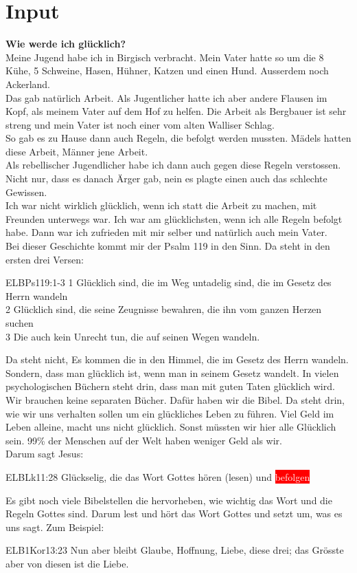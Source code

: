 \documentclass[12pt,a4paper]{scrarticle}
\begin{document}
\section{ Input }
\begin{spacing}{1.5}
\textbf{Wie werde ich glücklich?}\\
Meine Jugend habe ich in Birgisch verbracht. Mein Vater hatte so um die 8 Kühe, 5 Schweine, Hasen, Hühner, Katzen und einen Hund. Ausserdem noch Ackerland.\\
Das gab natürlich Arbeit. Als Jugentlicher hatte ich aber andere Flausen im Kopf, als meinem Vater auf dem Hof zu helfen. Die Arbeit als Bergbauer ist sehr streng und mein Vater ist noch einer vom alten Walliser Schlag.\\ So gab es zu Hause dann auch Regeln, die befolgt werden mussten. Mädels hatten diese Arbeit, Männer jene Arbeit.\\
Als rebellischer Jugendlicher habe ich dann auch gegen diese Regeln verstossen. Nicht nur, dass es danach Ärger gab, nein es plagte einen auch das schlechte Gewissen.\\ Ich war nicht wirklich glücklich, wenn ich statt die Arbeit zu machen, mit Freunden unterwegs war. Ich war am glücklichsten, wenn ich alle Regeln befolgt habe. Dann war ich zufrieden mit mir selber und natürlich auch mein Vater.\\
Bei dieser Geschichte kommt mir der Psalm 119 in den Sinn. Da steht in den ersten drei Versen:
\begin{bibeltext}{ELB}{Ps}{119:1-3}
1 Glücklich sind, die im Weg untadelig sind, die im Gesetz des Herrn wandeln\\
2 Glücklich sind, die seine Zeugnisse bewahren, die ihn vom ganzen Herzen suchen\\
3 Die auch kein Unrecht tun, die auf seinen Wegen wandeln.
\end{bibeltext}
Da steht nicht, \grqq Es kommen die in den Himmel, die im Gesetz des Herrn wandeln. \glqq{} Sondern, dass man glücklich ist, wenn man in seinem Gesetz wandelt. In vielen psychologischen Büchern steht drin, dass man mit guten Taten glücklich wird.\\
Wir brauchen keine separaten Bücher. Dafür haben wir die Bibel. Da steht drin, wie wir uns verhalten sollen um ein glückliches Leben zu führen. Viel Geld im Leben alleine, macht uns nicht glücklich. Sonst müssten wir hier alle Glücklich sein. 99\% der Menschen auf der Welt haben weniger Geld als wir.\\
Darum sagt Jesus:
\begin{bibeltext}{ELB}{Lk}{11:28}
Glückselig, die das Wort Gottes hören (lesen) und \colorbox{red}{\textcolor{white}{befolgen}}
\end{bibeltext}
Es gibt noch viele Bibelstellen die hervorheben, wie wichtig das Wort und die Regeln Gottes sind. Darum lest und hört das Wort Gottes und setzt um, was es uns sagt.
Zum Beispiel:
\begin{bibeltext}{ELB}{1Kor}{13:23}
Nun aber bleibt Glaube, Hoffnung, Liebe, diese drei; das Grösste aber von diesen ist die Liebe.
\end{bibeltext}


\end{spacing}
\end{document}
